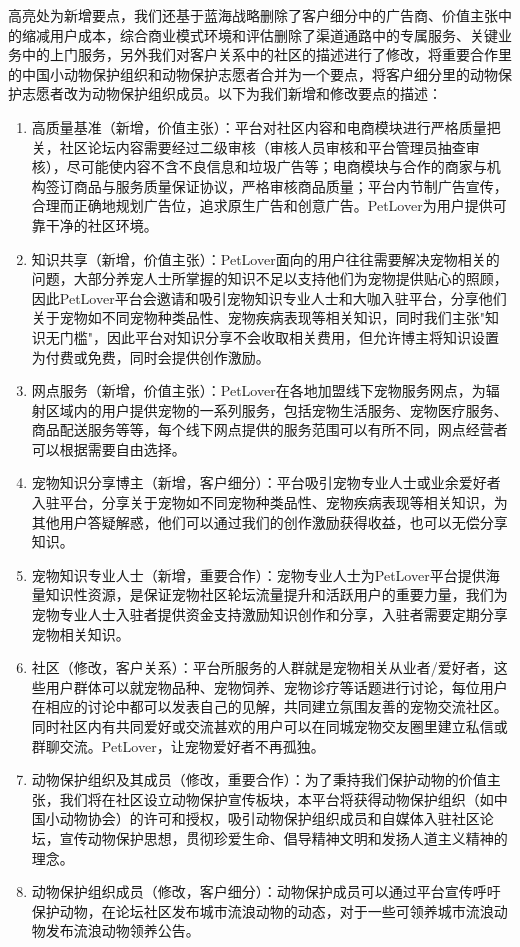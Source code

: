 \documentclass[a4paper]{ctexart}
\begin{document}
高亮处为新增要点，我们还基于蓝海战略删除了客户细分中的广告商、价值主张中的缩减用户成本，综合商业模式环境和评估删除了渠道通路中的专属服务、关键业务中的上门服务，另外我们对客户关系中的社区的描述进行了修改，将重要合作里的中国小动物保护组织和动物保护志愿者合并为一个要点，将客户细分里的动物保护志愿者改为动物保护组织成员。以下为我们新增和修改要点的描述：

\begin{enumerate}[label=\alph*.]
  \item 高质量基准（新增，价值主张）：平台对社区内容和电商模块进行严格质量把关，社区论坛内容需要经过二级审核（审核人员审核和平台管理员抽查审核），尽可能使内容不含不良信息和垃圾广告等；电商模块与合作的商家与机构签订商品与服务质量保证协议，严格审核商品质量；平台内节制广告宣传，合理而正确地规划广告位，追求原生广告和创意广告。PetLover为用户提供可靠干净的社区环境。
  \item 知识共享（新增，价值主张）：PetLover面向的用户往往需要解决宠物相关的问题，大部分养宠人士所掌握的知识不足以支持他们为宠物提供贴心的照顾，因此PetLover平台会邀请和吸引宠物知识专业人士和大咖入驻平台，分享他们关于宠物如不同宠物种类品性、宠物疾病表现等相关知识，同时我们主张"知识无门槛"，因此平台对知识分享不会收取相关费用，但允许博主将知识设置为付费或免费，同时会提供创作激励。
  \item 网点服务（新增，价值主张）：PetLover在各地加盟线下宠物服务网点，为辐射区域内的用户提供宠物的一系列服务，包括宠物生活服务、宠物医疗服务、商品配送服务等等，每个线下网点提供的服务范围可以有所不同，网点经营者可以根据需要自由选择。
  \item 宠物知识分享博主（新增，客户细分）：平台吸引宠物专业人士或业余爱好者入驻平台，分享关于宠物如不同宠物种类品性、宠物疾病表现等相关知识，为其他用户答疑解惑，他们可以通过我们的创作激励获得收益，也可以无偿分享知识。
  \item 宠物知识专业人士（新增，重要合作）：宠物专业人士为PetLover平台提供海量知识性资源，是保证宠物社区轮坛流量提升和活跃用户的重要力量，我们为宠物专业人士入驻者提供资金支持激励知识创作和分享，入驻者需要定期分享宠物相关知识。
  \item 社区（修改，客户关系）：平台所服务的人群就是宠物相关从业者/爱好者，这些用户群体可以就宠物品种、宠物饲养、宠物诊疗等话题进行讨论，每位用户在相应的讨论中都可以发表自己的见解，共同建立氛围友善的宠物交流社区。同时社区内有共同爱好或交流甚欢的用户可以在同城宠物交友圈里建立私信或群聊交流。PetLover，让宠物爱好者不再孤独。
  \item 动物保护组织及其成员（修改，重要合作）：为了秉持我们保护动物的价值主张，我们将在社区设立动物保护宣传板块，本平台将获得动物保护组织（如中国小动物协会）的许可和授权，吸引动物保护组织成员和自媒体入驻社区论坛，宣传动物保护思想，贯彻珍爱生命、倡导精神文明和发扬人道主义精神的理念。
  \item 动物保护组织成员（修改，客户细分）：动物保护成员可以通过平台宣传呼吁保护动物，在论坛社区发布城市流浪动物的动态，对于一些可领养城市流浪动物发布流浪动物领养公告。
\end{enumerate}
\end{document}
